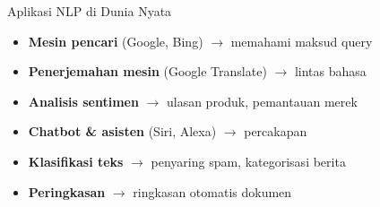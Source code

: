 \documentclass[aspectratio=169,t]{beamer}
\begin{document}
\begin{frame}{Aplikasi NLP di Dunia Nyata}
  \begin{itemize}
    \item[\textcolor{nvgreen}{\checkmark}] \textbf{Mesin pencari} (Google, Bing) $\to$ memahami maksud query
    \item[\textcolor{nvgreen}{\checkmark}] \textbf{Penerjemahan mesin} (Google Translate) $\to$ lintas bahasa
    \item[\textcolor{nvgreen}{\checkmark}] \textbf{Analisis sentimen} $\to$ ulasan produk, pemantauan merek
    \item[\textcolor{nvgreen}{\checkmark}] \textbf{Chatbot \& asisten} (Siri, Alexa) $\to$ percakapan
    \item[\textcolor{nvgreen}{\checkmark}] \textbf{Klasifikasi teks} $\to$ penyaring spam, kategorisasi berita
    \item[\textcolor{nvgreen}{\checkmark}] \textbf{Peringkasan} $\to$ ringkasan otomatis dokumen
  \end{itemize}
  \vspace{0.5em}
  \begin{center}
  \end{center}
\end{frame}
\end{document}
